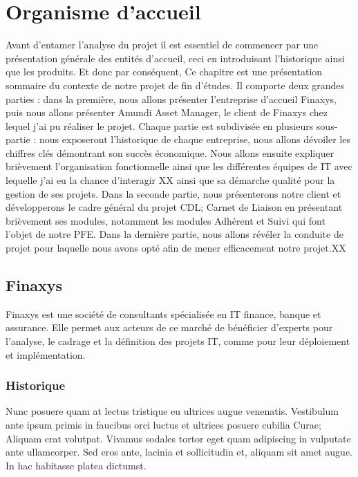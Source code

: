 
\chapter{Organisme d’accueil} %

\label{Chapter01} %

\par
Avant d'entamer l’analyse du projet il est essentiel de commencer par une présentation générale des entités d’accueil, ceci en introduisant l'historique ainsi que les produits. Et donc par conséquent, Ce chapitre est une présentation sommaire du contexte de notre projet de fin d’études. Il comporte deux grandes parties : dans la première, nous allons présenter l’entreprise d’accueil Finaxys, puis nous allons présenter Amundi Asset Manager, le client de Finaxys chez lequel j'ai pu réaliser le projet.
Chaque partie est subdivisée en plusieurs sous-partie : nous exposeront l'historique de chaque entreprise, nous allons dévoiler les chiffres clés démontrant son succès économique. Nous allons ensuite expliquer brièvement l'organisation fonctionnelle ainsi que les différentes équipes de IT avec lequelle j'ai eu la chance d'interagir XX ainsi que sa démarche qualité pour la gestion de ses projets. Dans la seconde partie, nous présenterons notre client et développerons le cadre général du projet CDL; Carnet de Liaison en présentant brièvement ses modules, notamment les modules Adhérent et Suivi qui font l’objet de notre PFE. Dans la dernière partie, nous allons révéler la conduite de projet pour laquelle nous avons opté afin de mener efficacement notre projet.XX


\section{Finaxys}
\par
Finaxys est une société de consultants spécialisée en IT finance, banque et assurance. Elle permet aux acteurs de ce marché de bénéficier d’experts pour l’analyse, le cadrage et la définition des projets IT, comme pour leur déploiement et implémentation.
\subsection{Historique}

Nunc posuere quam at lectus tristique eu ultrices augue venenatis. Vestibulum ante ipsum primis in faucibus orci luctus et ultrices posuere cubilia Curae; Aliquam erat volutpat. Vivamus sodales tortor eget quam adipiscing in vulputate ante ullamcorper. Sed eros ante, lacinia et sollicitudin et, aliquam sit amet augue. In hac habitasse platea dictumst.

